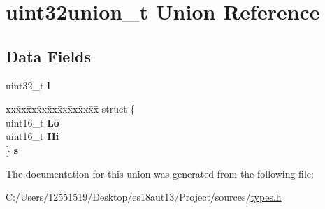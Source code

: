 \hypertarget{unionuint32union__t}{}\section{uint32union\+\_\+t Union Reference}
\label{unionuint32union__t}
\subsection*{Data Fields}
\begin{DoxyCompactItemize}
\item 
\hypertarget{unionuint32union__t_a02b7aaa4708411c52446dc5528f66c25}{}uint32\+\_\+t {\bfseries l}\label{unionuint32union__t_a02b7aaa4708411c52446dc5528f66c25}

\item 
\hypertarget{unionuint32union__t_a00b12f209c91b64c009f2eecafd298c2}{}\begin{tabbing}
xx\=xx\=xx\=xx\=xx\=xx\=xx\=xx\=xx\=\kill
struct \{\\
\>uint16\_t {\bfseries Lo}\\
\>uint16\_t {\bfseries Hi}\\
\} {\bfseries s}\label{unionuint32union__t_a00b12f209c91b64c009f2eecafd298c2}
\\

\end{tabbing}\end{DoxyCompactItemize}


The documentation for this union was generated from the following file\+:\begin{DoxyCompactItemize}
\item 
C\+:/\+Users/12551519/\+Desktop/es18aut13/\+Project/sources/\hyperlink{types_8h}{types.\+h}\end{DoxyCompactItemize}
